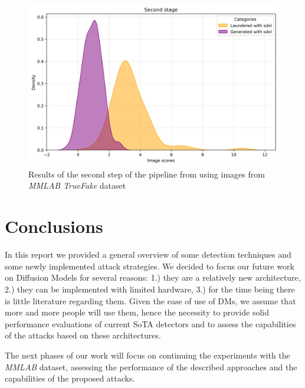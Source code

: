 \documentclass[conference]{IEEEtran} %
\begin{document}
    \begin{figure}[h]
        \centering
        \includegraphics[width=0.95\linewidth]{Img/second_stage.png}
        \caption{Results of the second step of the pipeline from \cite{mandelli2024synthetic} using images from \textit{MMLAB TrueFake} dataset}
        \label{fig:second_stage}
    \end{figure}

\section{Conclusions}
    In this report we provided a general overview of some detection techniques and some newly implemented attack strategies. We decided to focus our future work on Diffusion Models for several reasons: 1.) they are a relatively new architecture, 2.) they can be implemented with limited hardware, 3.) for the time being there is little literature regarding them. Given the ease of use of DMs, we assume that more and more people will use them, hence the necessity to provide solid performance evaluations of current SoTA detectors and to assess the capabilities of the attacks based on these architectures.

    The next phases of our work will focus on continuing the experiments with the \textit{MMLAB} dataset, assessing the performance of the described approaches and the capabilities of the proposed attacks.

\end{document}
